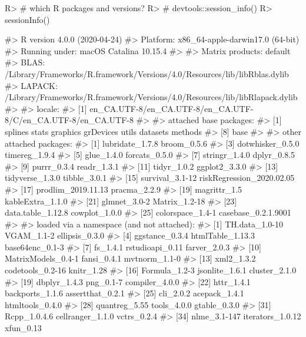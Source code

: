 \documentclass[
]{jss}
\begin{document}
\begin{CodeChunk}

\begin{CodeInput}
R> # which R packages and versions?
R> # devtools::session_info()
R> sessionInfo()
\end{CodeInput}

\begin{CodeOutput}
#> R version 4.0.0 (2020-04-24)
#> Platform: x86_64-apple-darwin17.0 (64-bit)
#> Running under: macOS Catalina 10.15.4
#> 
#> Matrix products: default
#> BLAS:   /Library/Frameworks/R.framework/Versions/4.0/Resources/lib/libRblas.dylib
#> LAPACK: /Library/Frameworks/R.framework/Versions/4.0/Resources/lib/libRlapack.dylib
#> 
#> locale:
#> [1] en_CA.UTF-8/en_CA.UTF-8/en_CA.UTF-8/C/en_CA.UTF-8/en_CA.UTF-8
#> 
#> attached base packages:
#> [1] splines   stats     graphics  grDevices utils     datasets  methods  
#> [8] base     
#> 
#> other attached packages:
#>  [1] lubridate_1.7.8           broom_0.5.6              
#>  [3] dotwhisker_0.5.0          timereg_1.9.4            
#>  [5] glue_1.4.0                forcats_0.5.0            
#>  [7] stringr_1.4.0             dplyr_0.8.5              
#>  [9] purrr_0.3.4               readr_1.3.1              
#> [11] tidyr_1.0.2               ggplot2_3.3.0            
#> [13] tidyverse_1.3.0           tibble_3.0.1             
#> [15] survival_3.1-12           riskRegression_2020.02.05
#> [17] prodlim_2019.11.13        pracma_2.2.9             
#> [19] magrittr_1.5              kableExtra_1.1.0         
#> [21] glmnet_3.0-2              Matrix_1.2-18            
#> [23] data.table_1.12.8         cowplot_1.0.0            
#> [25] colorspace_1.4-1          casebase_0.2.1.9001      
#> 
#> loaded via a namespace (and not attached):
#>  [1] TH.data_1.0-10      VGAM_1.1-2          ellipsis_0.3.0     
#>  [4] ggstance_0.3.4      htmlTable_1.13.3    base64enc_0.1-3    
#>  [7] fs_1.4.1            rstudioapi_0.11     farver_2.0.3       
#> [10] MatrixModels_0.4-1  fansi_0.4.1         mvtnorm_1.1-0      
#> [13] xml2_1.3.2          codetools_0.2-16    knitr_1.28         
#> [16] Formula_1.2-3       jsonlite_1.6.1      cluster_2.1.0      
#> [19] dbplyr_1.4.3        png_0.1-7           compiler_4.0.0     
#> [22] httr_1.4.1          backports_1.1.6     assertthat_0.2.1   
#> [25] cli_2.0.2           acepack_1.4.1       htmltools_0.4.0    
#> [28] quantreg_5.55       tools_4.0.0         gtable_0.3.0       
#> [31] Rcpp_1.0.4.6        cellranger_1.1.0    vctrs_0.2.4        
#> [34] nlme_3.1-147        iterators_1.0.12    xfun_0.13          

\end{CodeOutput}
\end{CodeChunk}
\end{document}
